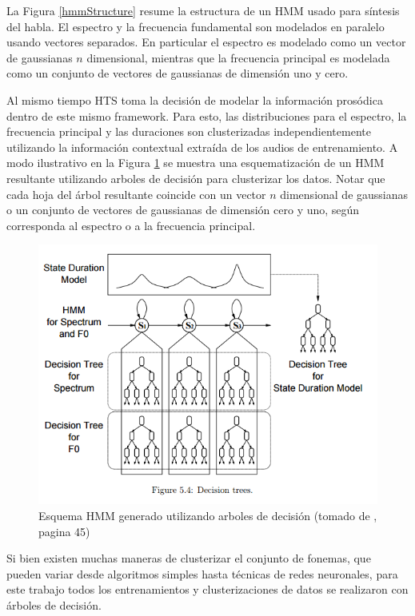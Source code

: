 La Figura \ref{hmmStructure} resume la estructura de un HMM usado para síntesis del habla. El espectro y la frecuencia fundamental son modelados en paralelo usando vectores separados. En particular el espectro es modelado como un vector de gaussianas $n$ dimensional, mientras que la frecuencia principal es modelada como un conjunto de vectores de gaussianas de dimensión uno y cero.

Al mismo tiempo HTS toma la decisión de modelar la información prosódica dentro de este mismo framework. Para esto, las distribuciones para el espectro, la frecuencia principal y las duraciones son clusterizadas independientemente utilizando la información contextual extraída de los audios de entrenamiento. A modo ilustrativo en la Figura \ref{hmmTree} se muestra una esquematización de un HMM resultante utilizando arboles de decisión para clusterizar los datos. Notar que cada hoja del árbol resultante coincide con un vector $n$ dimensional de gaussianas o un conjunto de vectores de gaussianas de dimensión cero y uno, según corresponda al espectro o a la frecuencia principal.

\begin{figure}
\includegraphics[scale=0.5]{imagenes/hmmContext.png}
\caption{Esquema HMM generado utilizando arboles de decisión (tomado de \cite{phoneticAndProsodic}, pagina 45)}
\label{hmmTree}
\centering
\end{figure}

Si bien existen muchas maneras de clusterizar el conjunto de fonemas, que pueden variar desde algoritmos simples hasta técnicas de redes neuronales, para este trabajo todos los entrenamientos y clusterizaciones de datos se realizaron con árboles de decisión. 

